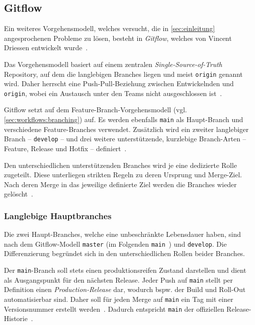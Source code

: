 
\subsection{Gitflow}
\label{sec:workflows:gitflow}

Ein weiteres Vorgehensmodell, welches versucht, die in \autoref{sec:einleitung} angesprochenen Probleme zu lösen, besteht in \emph{Gitflow}, welches \citeyear{driessenSuccessfulGitBranching2010} von Vincent Driessen entwickelt wurde~\cite{driessenSuccessfulGitBranching2010}.

Das Vorgehensmodell basiert auf einem zentralen \emph{Single\hyp Source\hyp of\hyp Truth} Repository, auf dem die langlebigen Branches liegen und meist \texttt{origin} genannt wird. Daher herrscht eine Push\hyp Pull\hyp Beziehung zwischen Entwickelnden und \texttt{origin}, wobei ein Austausch unter den Teams nicht ausgeschlossen ist~\cite{driessenSuccessfulGitBranching2010}.

Gitflow setzt auf dem Feature\hyp Branch\hyp Vorgehensmodell (vgl. \autoref{sec:workflows:branching}) auf. Es werden ebenfalls \texttt{main} als Haupt\hyp Branch und verschiedene Feature\hyp Branches verwendet. Zusätzlich wird ein zweiter langlebiger Branch -- \texttt{develop} -- und drei weitere unterstützende, kurzlebige Branch\hyp Arten -- Feature, Release und Hotfix -- definiert~\cite{driessenSuccessfulGitBranching2010}.

Den unterschiedlichen unterstützenden Branches wird je eine dedizierte Rolle zugeteilt. Diese unterliegen strikten Regeln zu deren Ursprung und Merge\hyp Ziel. Nach deren Merge in das jeweilige definierte Ziel werden die Branches wieder gelöscht~\cite{driessenSuccessfulGitBranching2010}.


\subsubsection{Langlebige Hauptbranches}

Die zwei Haupt\hyp Branches, welche eine unbeschränkte Lebensdauer haben, sind nach dem Gitflow\hyp Modell \texttt{master} (im Folgenden \texttt{main}~\cite{githubincRenamingDefaultBranch2022,softwarefreedomconservancyRegardingGitBranch2020}) und \texttt{develop}. Die Differenzierung begründet sich in den unterschiedlichen Rollen beider Branches.

Der \texttt{main}-Branch soll stets einen produktionsreifen Zustand darstellen und dient als Ausgangspunkt für den nächsten Release. Jeder Push auf \texttt{main} stellt per Definition einen \emph{Production-Release} dar, wodurch bspw. der Build und Roll-Out automatisierbar sind. Daher soll für jeden Merge auf \texttt{main} ein Tag mit einer Versionsnummer erstellt werden~\cite{driessenSuccessfulGitBranching2010}. Dadurch entspricht \texttt{main} der offiziellen Release\hyp Historie~\cite{atlassianGitflowWorkflow}.

